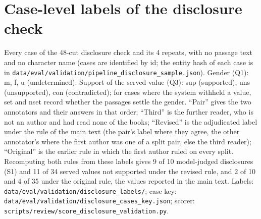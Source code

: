 \documentclass[11pt]{article}
\begin{document}
\section{Case-level labels of the disclosure check}
Every case of the 48-cut disclosure check and its 4 repeats, with no passage text and no character name (cases are identified by id; the entity hash of each case is in \nolinkurl{data/eval/validation/pipeline_disclosure_sample.json}). Gender (Q1): m, f, u (undetermined). Support of the served value (Q3): sup (supported), uns (unsupported), con (contradicted); for cases where the system withheld a value, set and nset record whether the passages settle the gender. ``Pair'' gives the two annotators and their answers in that order; ``Third'' is the further reader, who is not an author and had read none of the books; ``Revised'' is the adjudicated label under the rule of the main text (the pair's label where they agree, the other annotator's where the first author was one of a split pair, else the third reader); ``Original'' is the earlier rule in which the first author ruled on every split. Recomputing both rules from these labels gives 9 of 10 model-judged disclosures (S1) and 11 of 34 served values not supported under the revised rule, and 2 of 10 and 4 of 35 under the original rule, the values reported in the main text. Labels: \nolinkurl{data/eval/validation/disclosure_labels/}; case key: \nolinkurl{data/eval/validation/disclosure_cases_key.json}; scorer: \nolinkurl{scripts/review/score_disclosure_validation.py}.
\end{document}
